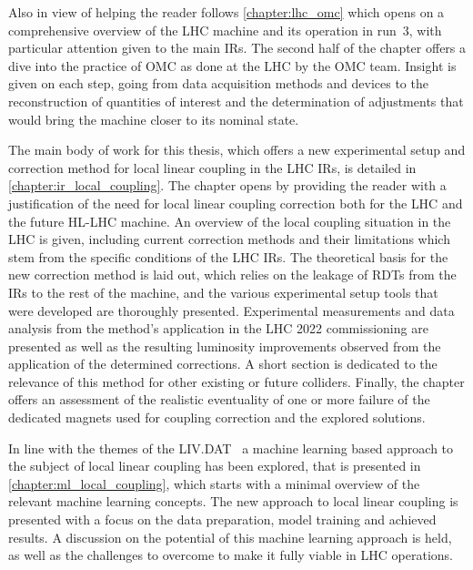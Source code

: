 Also in view of helping the reader follows \cref{chapter:lhc_omc} which opens on a comprehensive overview of the \gls{LHC} machine and its operation in \Gls{run}~\num{3}, with particular attention given to the main \glspl{IR}.
The second half of the chapter offers a dive into the practice of \gls{OMC} as done at the \gls{LHC} by the \gls{OMC} team.
Insight is given on each step, going from data acquisition methods and devices to the reconstruction of quantities of interest and the determination of adjustments that would bring the machine closer to its nominal state.

The main body of work for this thesis, which offers a new experimental setup and correction method for local linear coupling in the \gls{LHC} \glspl{IR}, is detailed in \cref{chapter:ir_local_coupling}.
The chapter opens by providing the reader with a justification of the need for local linear coupling correction both for the \gls{LHC} and the future \gls{HL-LHC} machine.
An overview of the local coupling situation in the \gls{LHC} is given, including current correction methods and their limitations which stem from the specific conditions of the \gls{LHC} \glspl{IR}.
The theoretical basis for the new correction method is laid out, which relies on the leakage of \glspl{RDT} from the \glspl{IR} to the rest of the machine, and the various experimental setup tools that were developed are thoroughly presented.
Experimental measurements and data analysis from the method's application in the \gls{LHC} \num{2022} commissioning are presented as well as the resulting \gls{luminosity} improvements observed from the application of the determined corrections.
A short section is dedicated to the relevance of this method for other existing or future colliders.
Finally, the chapter offers an assessment of the realistic eventuality of one or more failure of the dedicated magnets used for coupling correction and the explored solutions.

In line with the themes of the \gls{LIV.DAT}~\cite{Website:LIVDAT} a machine learning based approach to the subject of local linear coupling has been explored, that is presented in \cref{chapter:ml_local_coupling}, which starts with a minimal overview of the relevant machine learning concepts.
The new approach to local linear coupling is presented with a focus on the data preparation, model training and achieved results.
A discussion on the potential of this machine learning approach is held, as well as the challenges to overcome to make it fully viable in \gls{LHC} operations.

